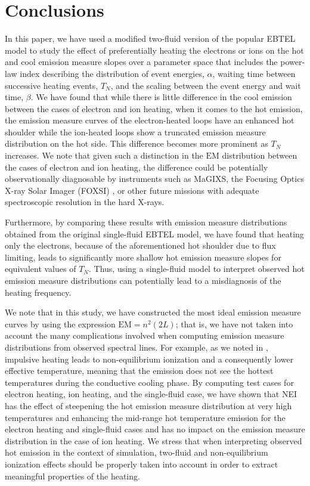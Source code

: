 \documentclass[apj]{emulateapj}
\begin{document}
	\section{Conclusions}
	\label{sec:conclusions}
	\par In this paper, we have used a modified two-fluid version of the popular EBTEL model to study the effect of preferentially heating the electrons or ions on the hot and cool emission measure slopes over a parameter space that includes the power-law index describing the distribution of event energies, $\alpha$, waiting time between successive heating events, $T_N$, and the scaling between the event energy and wait time, $\beta$. We have found that while there is little difference in the cool emission between the cases of electron and ion heating, when it comes to the hot emission, the emission measure curves of the electron-heated loops have an enhanced hot shoulder while the ion-heated loops show a truncated emission measure distribution on the hot side. This difference becomes more prominent as $T_N$ increases. We note that given such a distinction in the $\mathrm{EM}$ distribution between the cases of electron and ion heating, the difference could be potentially observationally diagnosable by instruments such as MaGIXS, the Focusing Optics X-ray Solar Imager (FOXSI) \citep{krucker_focusing_2011}, or other future missions with adequate spectroscopic resolution in the hard X-rays.
	\par Furthermore, by comparing these results with emission measure distributions obtained from the original single-fluid EBTEL model, we have found that heating only the electrons, because of the aforementioned hot shoulder due to flux limiting, leads to significantly more shallow hot emission measure slopes for equivalent values of $T_N$. Thus, using a single-fluid model to interpret observed hot emission measure distributions can potentially lead to a misdiagnosis of the heating frequency.
	\par We note that in this study, we have constructed the most ideal emission measure curves by using the expression $\mathrm{EM}=n^2(2L)$; that is, we have not taken into account the many complications involved when computing emission measure distributions from observed spectral lines. For example, as we noted in , impulsive heating leads to non-equilibrium ionization and a consequently lower effective temperature, meaning that the emission does not see the hottest temperatures during the conductive cooling phase. By computing test cases for electron heating, ion heating, and the single-fluid case, we have shown that NEI has the effect of steepening the hot emission measure distribution at very high temperatures and enhancing the mid-range hot temperature emission for the electron heating and single-fluid cases and has no impact on the emission measure distribution in the case of ion heating. We stress that when interpreting observed hot emission in the context of simulation, two-fluid and non-equilibrium ionization effects should be properly taken into account in order to extract meaningful properties of the heating.
\end{document}

